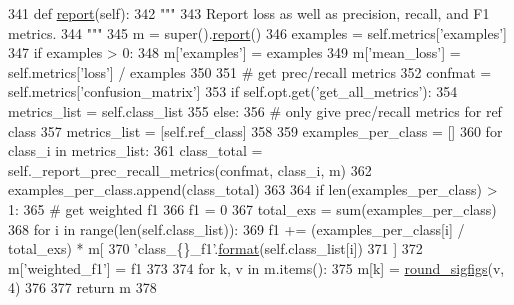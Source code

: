\begin{DoxyCode}
341     \textcolor{keyword}{def }\hyperlink{namespaceprojects_1_1convai2_1_1eval__f1_a01a47b9c08dad189837a51f085defc45}{report}(self):
342         \textcolor{stringliteral}{"""}
343 \textcolor{stringliteral}{        Report loss as well as precision, recall, and F1 metrics.}
344 \textcolor{stringliteral}{        """}
345         m = super().\hyperlink{namespaceprojects_1_1convai2_1_1eval__f1_a01a47b9c08dad189837a51f085defc45}{report}()
346         examples = self.metrics[\textcolor{stringliteral}{'examples'}]
347         \textcolor{keywordflow}{if} examples > 0:
348             m[\textcolor{stringliteral}{'examples'}] = examples
349             m[\textcolor{stringliteral}{'mean\_loss'}] = self.metrics[\textcolor{stringliteral}{'loss'}] / examples
350 
351             \textcolor{comment}{# get prec/recall metrics}
352             confmat = self.metrics[\textcolor{stringliteral}{'confusion\_matrix'}]
353             \textcolor{keywordflow}{if} self.opt.get(\textcolor{stringliteral}{'get\_all\_metrics'}):
354                 metrics\_list = self.class\_list
355             \textcolor{keywordflow}{else}:
356                 \textcolor{comment}{# only give prec/recall metrics for ref class}
357                 metrics\_list = [self.ref\_class]
358 
359             examples\_per\_class = []
360             \textcolor{keywordflow}{for} class\_i \textcolor{keywordflow}{in} metrics\_list:
361                 class\_total = self.\_report\_prec\_recall\_metrics(confmat, class\_i, m)
362                 examples\_per\_class.append(class\_total)
363 
364             \textcolor{keywordflow}{if} len(examples\_per\_class) > 1:
365                 \textcolor{comment}{# get weighted f1}
366                 f1 = 0
367                 total\_exs = sum(examples\_per\_class)
368                 \textcolor{keywordflow}{for} i \textcolor{keywordflow}{in} range(len(self.class\_list)):
369                     f1 += (examples\_per\_class[i] / total\_exs) * m[
370                         \textcolor{stringliteral}{'class\_\{\}\_f1'}.\hyperlink{namespaceparlai_1_1chat__service_1_1services_1_1messenger_1_1shared__utils_a32e2e2022b824fbaf80c747160b52a76}{format}(self.class\_list[i])
371                     ]
372                 m[\textcolor{stringliteral}{'weighted\_f1'}] = f1
373 
374         \textcolor{keywordflow}{for} k, v \textcolor{keywordflow}{in} m.items():
375             m[k] = \hyperlink{namespaceparlai_1_1agents_1_1legacy__agents_1_1seq2seq_1_1utils__v0_af377ec61bfc0423461e7b409ffc883b9}{round\_sigfigs}(v, 4)
376 
377         \textcolor{keywordflow}{return} m
378 
\end{DoxyCode}
\mbox{\label{classparlai_1_1core_1_1torch__classifier__agent_1_1TorchClassifierAgent_ac96e55ac13019eace0641a7efcf6dc44}} 
